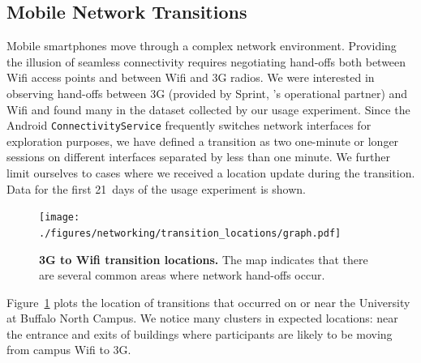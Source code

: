 \subsection{Mobile Network Transitions}
\label{subsec-networktransitions}

Mobile smartphones move through a complex network environment. Providing the
illusion of seamless connectivity requires negotiating hand-offs both between
Wifi access points and between Wifi and 3G radios. We were interested in
observing hand-offs between 3G (provided by Sprint, \PhoneLab{}'s operational
partner) and Wifi and found many in the dataset collected by our usage
experiment. Since the Android \texttt{ConnectivityService} frequently
switches network interfaces for exploration purposes, we have defined a
transition as two one-minute or longer sessions on different interfaces
separated by less than one minute. We further limit ourselves to cases where
we received a location update during the transition. Data for the first
21~days of the usage experiment is shown.

\begin{figure}[t]

\centering
\texttt{[image: ./figures/networking/transition\_locations/graph.pdf]}

\caption{\textbf{3G to Wifi transition locations.} The map indicates that
there are several common areas where network hand-offs occur.}

\label{figure-networktransitions}

\vspace*{-0.1in}

\end{figure}

Figure~\ref{figure-networktransitions} plots the location of transitions that
occurred on or near the University at Buffalo North Campus. We notice many
clusters in expected locations: near the entrance and exits of buildings
where participants are likely to be moving from campus Wifi to 3G.
